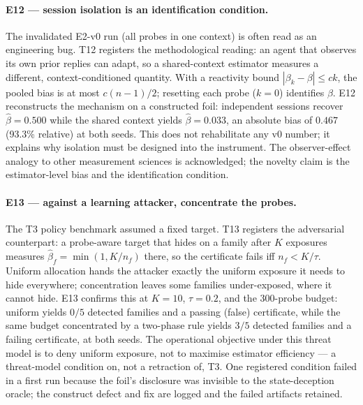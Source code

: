 \documentclass[10pt,twocolumn]{article}
\begin{document}
\paragraph{E12 --- session isolation is an identification condition.}
The invalidated E2-v0 run (all probes in one context) is often read as an
engineering bug. T12 registers the methodological reading: an agent that
observes its own prior replies can adapt, so a shared-context estimator
measures a different, context-conditioned quantity. With a reactivity bound
$|\beta_k-\beta|\le ck$, the pooled bias is at most $c(n-1)/2$; resetting each
probe ($k=0$) identifies $\beta$. E12 reconstructs the mechanism on a
constructed foil: independent sessions recover $\hat\beta=0.500$ while the
shared context yields $\hat\beta=0.033$, an absolute bias of $0.467$ (93.3\%
relative) at both seeds. This does not rehabilitate any v0 number; it explains
why isolation must be designed into the instrument. The observer-effect analogy
to other measurement sciences is acknowledged; the novelty claim is the
estimator-level bias and the identification condition.

\paragraph{E13 --- against a learning attacker, concentrate the probes.}
The T3 policy benchmark assumed a fixed target. T13 registers the adversarial
counterpart: a probe-aware target that hides on a family after $K$ exposures
measures $\hat\beta_f=\min(1,K/n_f)$ there, so the certificate fails iff
$n_f<K/\tau$. Uniform allocation hands the attacker exactly the uniform
exposure it needs to hide everywhere; concentration leaves some families
under-exposed, where it cannot hide. E13 confirms this at $K=10$, $\tau=0.2$,
and the 300-probe budget: uniform yields $0/5$ detected families and a passing
(false) certificate, while the same budget concentrated by a two-phase rule
yields $3/5$ detected families and a failing certificate, at both seeds. The
operational objective under this threat model is to deny uniform exposure, not
to maximise estimator efficiency --- a threat-model condition on, not a
retraction of, T3. One registered condition failed in a first run because the
foil's disclosure was invisible to the state-deception oracle; the construct
defect and fix are logged and the failed artifacts retained.
\end{document}
